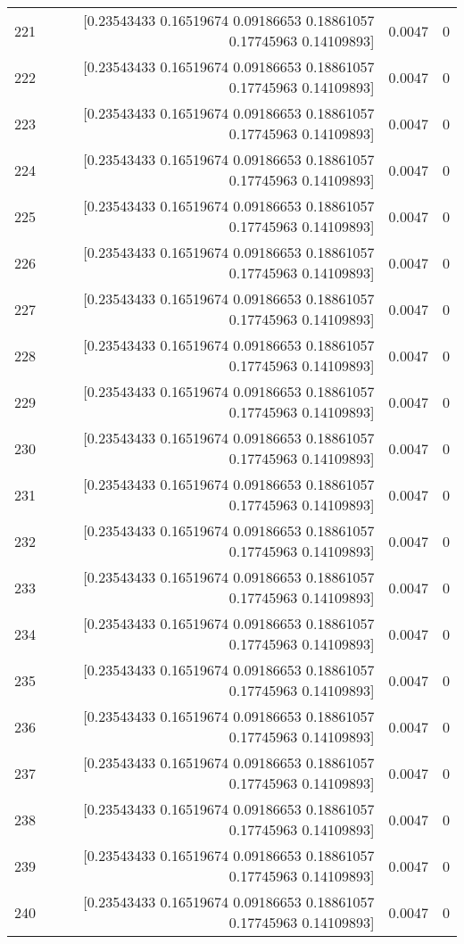 \begin{longtable}{lrrr}
221 & [0.23543433 0.16519674 0.09186653 0.18861057 0.17745963 0.14109893] & 0.0047 & 0 \\
222 & [0.23543433 0.16519674 0.09186653 0.18861057 0.17745963 0.14109893] & 0.0047 & 0 \\
223 & [0.23543433 0.16519674 0.09186653 0.18861057 0.17745963 0.14109893] & 0.0047 & 0 \\
224 & [0.23543433 0.16519674 0.09186653 0.18861057 0.17745963 0.14109893] & 0.0047 & 0 \\
225 & [0.23543433 0.16519674 0.09186653 0.18861057 0.17745963 0.14109893] & 0.0047 & 0 \\
226 & [0.23543433 0.16519674 0.09186653 0.18861057 0.17745963 0.14109893] & 0.0047 & 0 \\
227 & [0.23543433 0.16519674 0.09186653 0.18861057 0.17745963 0.14109893] & 0.0047 & 0 \\
228 & [0.23543433 0.16519674 0.09186653 0.18861057 0.17745963 0.14109893] & 0.0047 & 0 \\
229 & [0.23543433 0.16519674 0.09186653 0.18861057 0.17745963 0.14109893] & 0.0047 & 0 \\
230 & [0.23543433 0.16519674 0.09186653 0.18861057 0.17745963 0.14109893] & 0.0047 & 0 \\
231 & [0.23543433 0.16519674 0.09186653 0.18861057 0.17745963 0.14109893] & 0.0047 & 0 \\
232 & [0.23543433 0.16519674 0.09186653 0.18861057 0.17745963 0.14109893] & 0.0047 & 0 \\
233 & [0.23543433 0.16519674 0.09186653 0.18861057 0.17745963 0.14109893] & 0.0047 & 0 \\
234 & [0.23543433 0.16519674 0.09186653 0.18861057 0.17745963 0.14109893] & 0.0047 & 0 \\
235 & [0.23543433 0.16519674 0.09186653 0.18861057 0.17745963 0.14109893] & 0.0047 & 0 \\
236 & [0.23543433 0.16519674 0.09186653 0.18861057 0.17745963 0.14109893] & 0.0047 & 0 \\
237 & [0.23543433 0.16519674 0.09186653 0.18861057 0.17745963 0.14109893] & 0.0047 & 0 \\
238 & [0.23543433 0.16519674 0.09186653 0.18861057 0.17745963 0.14109893] & 0.0047 & 0 \\
239 & [0.23543433 0.16519674 0.09186653 0.18861057 0.17745963 0.14109893] & 0.0047 & 0 \\
240 & [0.23543433 0.16519674 0.09186653 0.18861057 0.17745963 0.14109893] & 0.0047 & 0 \\

\end{longtable}

